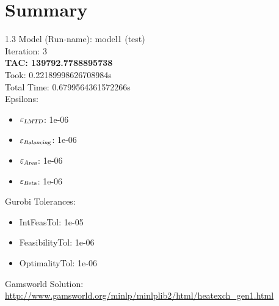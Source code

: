 \documentclass{article}%
\begin{document}
%
\normalsize%
\section{Summary}%
\thispagestyle{plain}%
\begin{spacing}{1.3}%
\Large%
Model (Run-name): model1 (test)\\%
Iteration: 3\\%
\textbf{TAC: 139792.7788895738}\\%
Took: 0.22189998626708984s\\%
Total Time: 0.6799564361572266s\\%
Epsilons:%
\begin{itemize}%
	\item $\varepsilon_{\textsl{LMTD}}$: 1e-06%
	\item $\varepsilon_{\textsl{Balancing}}$: 1e-06%
	\item $\varepsilon_{\textsl{Area}}$: 1e-06%
	\item $\varepsilon_{\textsl{Beta}}$: 1e-06%
\end{itemize}%
Gurobi Tolerances:%
\begin{itemize}%
	\item IntFeasTol: 1e-05%
	\item FeasibilityTol: 1e-06%
	\item OptimalityTol: 1e-06%
\end{itemize}%
\end{spacing}%
\normalsize%
Gamsworld Solution: \url{http://www.gamsworld.org/minlp/minlplib2/html/heatexch_gen1.html}%
%
\clearpage%
\end{document}
